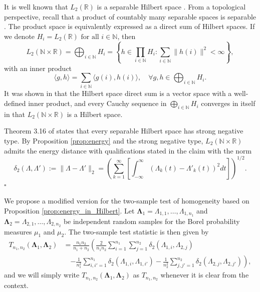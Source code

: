 \documentclass[12pt]{article}
\newenvironment{proof}[1][Proof]{\begin{trivlist}
\item[\hskip \labelsep {\bfseries #1}]}{\end{trivlist}}
\newcommand{\bbR}{\mathbb{R}}
\newcommand{\bbN}{\mathbb{N}}
\newcommand{\bfLambda}{\mathbf{\Lambda}}
\begin{document}
\begin{proof}
	It is well known that $L_2 (\bbR)$ is a separable Hilbert space \citep{stein_functional_2011}. From a topological perspective, recall that a product of countably many separable spaces is separable \citep{willard_general_1970}. The product space is equivalently expressed as a direct sum of Hilbert spaces. If we denote $H_i = L_2 (\bbR)\textrm{ for all } i \in \bbN$, then 
	\begin{equation*}
	L_2 (\bbN \times \bbR) = \bigoplus_{i \in \bbN} H_i =  \left\lbrace h \in \prod_{i\in \bbN} H_i : \sum_{i \in \bbN}    \|h(i)\|^2 < \infty \right\rbrace,
	\end{equation*}
	with an inner product
	\begin{equation*}
	\langle g, h \rangle = \sum_{i \in \bbN} \langle g(i), h(i) \rangle,\quad \forall g,h \in \bigoplus_{i \in \bbN} H_i.
	\end{equation*}
	It was shown in \cite{conway_course_1997} that the Hilbert space direct sum is a vector space with a well-defined inner product, and every Cauchy sequence in $\bigoplus_{i \in \bbN} H_i$ converges in itself in that $L_2 (\bbN \times \bbR)$ is a Hilbert space.
	
	
	Theorem 3.16 of \cite{lyons_distance_2013} states that every separable Hilbert space has strong negative type. By Proposition \ref{prop:energy} and the strong negative type, $L_2 (\bbN \times \bbR)$ admits the energy distance with qualifications stated in the claim with the norm 
	\begin{equation*}	 
	\delta_2(\Lambda,\Lambda') := \| \Lambda -\Lambda' \|_2 = \left(
	\sum_{k=1}^\infty \left\lbrack\int_{-\infty}^{\infty}
	\left(	\Lambda_k (t) - \Lambda'_k(t)\right)^2 dt
	\right\rbrack
	\right)^{1/2}. 
	\end{equation*}\hfill $\square$
\end{proof}

We propose a modified version for the two-sample test of homogeneity \citep{szekely_testing_2004} based on Proposition \ref{prop:energy_in_Hilbert}. Let $\bfLambda_1 = \Lambda_{1,1}, \ldots, \Lambda_{1,n_1}$ and $\bfLambda_2 = \Lambda_{2,1}, \ldots, \Lambda_{2,n_2}$ be independent random samples for the Borel probability measures $\mu_1$ and $\mu_2$. The two-sample test statistic is then given by
\begin{equation}\label{eq:statistic_two_sample}
\begin{split}
T_{n_1,n_2} (\bfLambda_1, \bfLambda_2) &= \frac{n_1 n_2}{n_1 + n_2} 
\left( \frac{2}{n_1 n_2} \sum_{i=1}^{n_1} \sum_{j=1}^{n_2} \delta_2 (\Lambda_{1,i}, \Lambda_{2,j}) \right. \\
&\quad \left. - \frac{1}{n_1^2} \sum_{i,i'=1}^{n_1} \delta_2 (\Lambda_{1,i}, \Lambda_{1,i'})
- \frac{1}{n_2^2} \sum_{j,j'=1}^{n_2} \delta_2 (\Lambda_{2,j}, \Lambda_{2,j'}) \right),
\end{split}
\end{equation}
and we will simply write $T_{n_1,n_2} (\bfLambda_1, \bfLambda_2)$ as $T_{n_1,n_2}$ whenever it is clear from the context.
\end{document}
